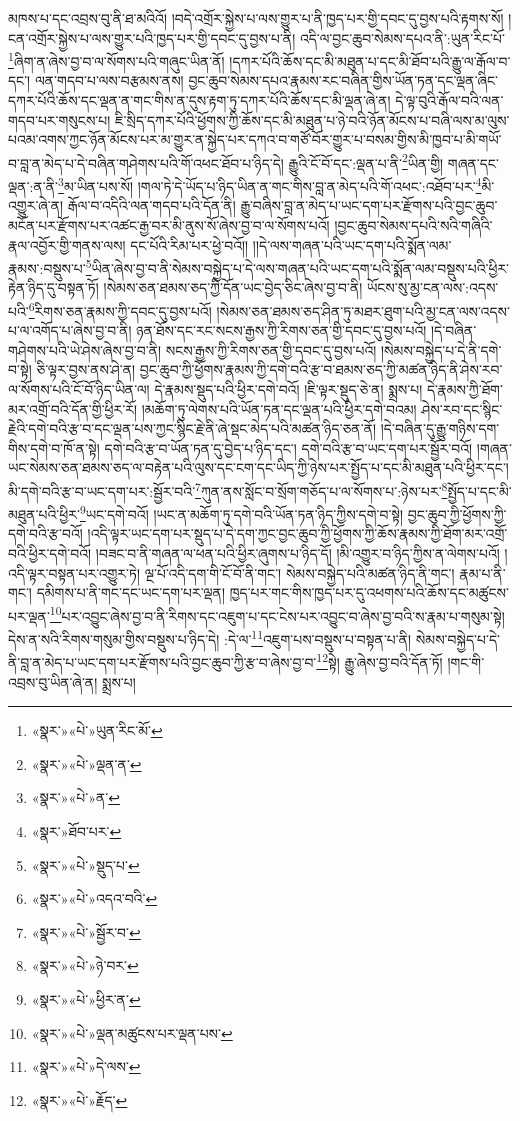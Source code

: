 མཁས་པ་དང་འབྲས་བུ་ནི་ཐ་མའིའོ། །བདེ་འགྲོར་སྐྱེས་པ་ལས་གྱུར་པ་ནི་ཁྱད་པར་གྱི་དབང་དུ་བྱས་པའི་རྟགས་སོ། །ངན་འགྲོར་སྐྱེས་པ་ལས་གྱུར་པའི་ཁྱད་པར་གྱི་དབང་དུ་བྱས་པ་ནི། འདི་ལ་བྱང་ཆུབ་སེམས་དཔའ་ནི་:ཡུན་རིང་པོ་\footnote{«སྣར་»«པེ་»ཡུན་རིང་མོ་}ཞིག་ན་ཞེས་བྱ་བ་ལ་སོགས་པའི་གཞུང་ཡིན་ནོ། །དཀར་པོའི་ཆོས་དང་མི་མཐུན་པ་དང་མི་ཐོབ་པའི་རྒྱུ་ལ་རྒོལ་བ་དང་། ལན་གདབ་པ་ལས་བརྩམས་ནས། བྱང་ཆུབ་སེམས་དཔའ་རྣམས་རང་བཞིན་གྱིས་ཡོན་ཏན་དང་ལྡན་ཞིང་དཀར་པོའི་ཆོས་དང་ལྡན་ན་གང་གིས་ན་དུས་རྟག་ཏུ་དཀར་པོའི་ཆོས་དང་མི་ལྡན་ཞེ་ན། དེ་ལྟ་བུའི་རྒོལ་བའི་ལན་གདབ་པར་གསུངས་པ། ཇི་སྲིད་དཀར་པོའི་ཕྱོགས་ཀྱི་ཆོས་དང་མི་མཐུན་པ་ཉེ་བའི་ཉོན་མོངས་པ་བཞི་ལས་མ་ལུས་པའམ་འགས་ཀྱང་ཉོན་མོངས་པར་མ་གྱུར་ན་སྐྱེད་པར་དཀའ་བ་གཙོ་བོར་གྱུར་པ་བསམ་གྱིས་མི་ཁྱབ་པ་མི་གཡོ་བ་བླ་ན་མེད་པ་དེ་བཞིན་གཤེགས་པའི་གོ་འཕང་ཐོབ་པ་ཉིད་དེ། རྒྱུའི་ངོ་བོ་དང་:ལྡན་པ་ནི་\footnote{«སྣར་»«པེ་»ལྡན་ན་}ཡིན་གྱི། གཞན་དང་ལྡན་:ན་ནི་\footnote{«སྣར་»«པེ་»ན་}མ་ཡིན་པས་སོ། །གལ་ཏེ་དེ་ཡོད་པ་ཉིད་ཡིན་ན་གང་གིས་བླ་ན་མེད་པའི་གོ་འཕང་:འཐོབ་པར་\footnote{«སྣར་»ཐོབ་པར་}མི་འགྱུར་ཞེ་ན། རྒོལ་བ་འདིའི་ལན་གདབ་པའི་དོན་ནི། རྒྱུ་བཞིས་བླ་ན་མེད་པ་ཡང་དག་པར་རྫོགས་པའི་བྱང་ཆུབ་མངོན་པར་རྫོགས་པར་འཚང་རྒྱ་བར་མི་ནུས་སོ་ཞེས་བྱ་བ་ལ་སོགས་པའོ། །བྱང་ཆུབ་སེམས་དཔའི་སའི་གཞིའི་རྣལ་འབྱོར་གྱི་གནས་ལས། དང་པོའི་རིམ་པར་ཕྱེ་བའོ།། །།དེ་ལས་གཞན་པའི་ཡང་དག་པའི་སྨོན་ལམ་རྣམས་:བསྡུས་པ་\footnote{«སྣར་»«པེ་»སྡུད་པ་}ཡིན་ཞེས་བྱ་བ་ནི་སེམས་བསྐྱེད་པ་དེ་ལས་གཞན་པའི་ཡང་དག་པའི་སྨོན་ལམ་བསྡུས་པའི་ཕྱིར་རྟེན་ཉིད་དུ་བསྟན་ཏོ། །སེམས་ཅན་ཐམས་ཅད་ཀྱི་དོན་ཡང་བྱེད་ཅིང་ཞེས་བྱ་བ་ནི། ཡོངས་སུ་མྱ་ངན་ལས་:འདས་པའི་\footnote{«སྣར་»«པེ་»འདའ་བའི་}རིགས་ཅན་རྣམས་ཀྱི་དབང་དུ་བྱས་པའོ། །སེམས་ཅན་ཐམས་ཅད་ཤིན་ཏུ་མཐར་ཐུག་པའི་མྱ་ངན་ལས་འདས་པ་ལ་འགོད་པ་ཞེས་བྱ་བ་ནི། ཉན་ཐོས་དང་རང་སངས་རྒྱས་ཀྱི་རིགས་ཅན་གྱི་དབང་དུ་བྱས་པའོ། །དེ་བཞིན་གཤེགས་པའི་ཡེ་ཤེས་ཞེས་བྱ་བ་ནི། སངས་རྒྱས་ཀྱི་རིགས་ཅན་གྱི་དབང་དུ་བྱས་པའོ། །སེམས་བསྐྱེད་པ་དེ་ནི་དགེ་བ་སྟེ། ཅི་ལྟར་བྱས་ནས་ཤེ་ན། བྱང་ཆུབ་ཀྱི་ཕྱོགས་རྣམས་ཀྱི་དགེ་བའི་རྩ་བ་ཐམས་ཅད་ཀྱི་མཚན་ཉིད་ནི་ཤེས་རབ་ལ་སོགས་པའི་ངོ་བོ་ཉིད་ཡིན་ལ། དེ་རྣམས་སྡུད་པའི་ཕྱིར་དགེ་བའོ། །ཇི་ལྟར་སྡུད་ཅེ་ན། སྨྲས་པ། དེ་རྣམས་ཀྱི་ཐོག་མར་འགྲོ་བའི་དོན་གྱི་ཕྱིར་རོ། །མཆོག་ཏུ་ལེགས་པའི་ཡོན་ཏན་དང་ལྡན་པའི་ཕྱིར་དགེ་བའམ། ཤེས་རབ་དང་སྙིང་རྗེའི་དགེ་བའི་རྩ་བ་དང་ལྡན་པས་ཀྱང་སྙིང་རྗེ་ནི་ཞེ་སྡང་མེད་པའི་མཚན་ཉིད་ཅན་ནོ། །དེ་བཞིན་དུ་རྒྱུ་གཉིས་དག་གིས་དགེ་བ་ཁོ་ན་སྟེ། དགེ་བའི་རྩ་བ་ཡོན་ཏན་དུ་བྱེད་པ་ཉིད་དང་། དགེ་བའི་རྩ་བ་ཡང་དག་པར་སྦྱོར་བའོ། །གཞན་ཡང་སེམས་ཅན་ཐམས་ཅད་ལ་བརྟེན་པའི་ལུས་དང་ངག་དང་ཡིད་ཀྱི་ཉེས་པར་སྤྱོད་པ་དང་མི་མཐུན་པའི་ཕྱིར་དང་། མི་དགེ་བའི་རྩ་བ་ཡང་དག་པར་:སྦྱོར་བའི་\footnote{«སྣར་»«པེ་»སྦྱོར་བ་}ཀུན་ནས་སློང་བ་སྲོག་གཅོད་པ་ལ་སོགས་པ་:ཉེས་པར་\footnote{«སྣར་»«པེ་»ཉེ་བར་}སྤྱོད་པ་དང་མི་མཐུན་པའི་ཕྱིར་\footnote{«སྣར་»«པེ་»ཕྱིར་ན་}ཡང་དགེ་བའོ། །ཡང་ན་མཆོག་ཏུ་དགེ་བའི་ཡོན་ཏན་ཉིད་ཀྱིས་དགེ་བ་སྟེ། བྱང་ཆུབ་ཀྱི་ཕྱོགས་ཀྱི་དགེ་བའི་རྩ་བའོ། །འདི་ལྟར་ཡང་དག་པར་སྡུད་པ་དེ་དག་ཀྱང་བྱང་ཆུབ་ཀྱི་ཕྱོགས་ཀྱི་ཆོས་རྣམས་ཀྱི་ཐོག་མར་འགྲོ་བའི་ཕྱིར་དགེ་བའོ། །བཟང་བ་ནི་གཞན་ལ་ཕན་པའི་ཕྱིར་ཞུགས་པ་ཉིད་དོ། །མི་འགྱུར་བ་ཉིད་ཀྱིས་ན་ལེགས་པའོ། །འདི་ལྟར་བསྟན་པར་འགྱུར་ཏེ། ལྔ་པོ་འདི་དག་གི་ངོ་བོ་ནི་གང་། སེམས་བསྐྱེད་པའི་མཚན་ཉིད་ནི་གང་། རྣམ་པ་ནི་གང་། དམིགས་པ་ནི་གང་དང་ཡང་དག་པར་ལྡན། ཁྱད་པར་གང་གིས་ཁྱད་པར་དུ་འཕགས་པའི་ཆོས་དང་མཚུངས་པར་ལྡན་\footnote{«སྣར་»«པེ་»ལྡན་མཚུངས་པར་ལྡན་པས་}པར་འབྱུང་ཞེས་བྱ་བ་ནི་རིགས་དང་འཇུག་པ་དང་ངེས་པར་འབྱུང་བ་ཞེས་བྱ་བའི་ས་རྣམ་པ་གསུམ་སྟེ། དེས་ན་སའི་རིགས་གསུམ་གྱིས་བསྡུས་པ་ཉིད་དེ། :དེ་ལ་\footnote{«སྣར་»«པེ་»དེ་ལས་}འཇུག་པས་བསྡུས་པ་བསྟན་པ་ནི། སེམས་བསྐྱེད་པ་དེ་ནི་བླ་ན་མེད་པ་ཡང་དག་པར་རྫོགས་པའི་བྱང་ཆུབ་ཀྱི་རྩ་བ་ཞེས་བྱ་བ་\footnote{«སྣར་»«པེ་»རྗོད་}སྟེ། རྒྱུ་ཞེས་བྱ་བའི་དོན་ཏོ། །གང་གི་འབྲས་བུ་ཡིན་ཞེ་ན། སྨྲས་པ། 